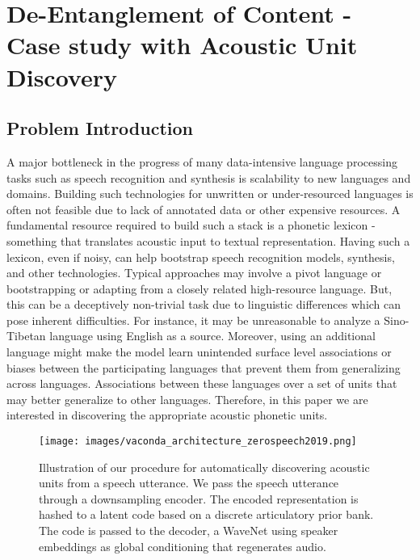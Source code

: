 \chapter{De-Entanglement of Content - Case study with Acoustic Unit Discovery}

\section{Problem Introduction}
A major bottleneck in the progress of many data-intensive language processing tasks such as speech recognition and synthesis is scalability to new languages and domains. 
Building such technologies for unwritten or under-resourced languages is often not feasible due to lack of annotated data or other expensive resources. 
A fundamental resource required to build such a stack is a phonetic lexicon - something that translates acoustic input to textual representation. Having such a lexicon, even if noisy, can help bootstrap speech recognition models, synthesis, and other technologies. Typical approaches may involve a pivot language or bootstrapping or adapting from a closely related high-resource language.
But, this can be a deceptively non-trivial task due to linguistic differences which can pose inherent difficulties. 
For instance, it may be unreasonable to analyze a Sino-Tibetan language using English as a source. Moreover, using an additional language might make the model learn unintended surface level associations or biases between the participating languages that prevent them from generalizing across languages. Associations between these languages over a set of units that may better generalize to other languages. Therefore, in this paper we are interested in discovering the appropriate acoustic phonetic units. 

\begin{figure}[t]
\centering
\texttt{[image: images/vaconda\_architecture\_zerospeech2019.png]}
\caption{Illustration of our procedure for automatically discovering acoustic units from a speech utterance. We pass the speech utterance through a downsampling encoder. The encoded representation is hashed to a latent code based on a discrete articulatory prior bank. The code is passed to the decoder, a WaveNet using speaker embeddings as global conditioning that regenerates audio. } 
\label{frame_replacement_overview}
\end{figure}  


